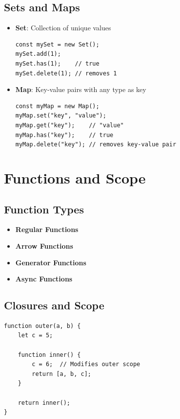 \documentclass{article}
\begin{document}
\subsection{Sets and Maps}
\begin{itemize}
    \item \textbf{Set}: Collection of unique values
    \begin{lstlisting}
const mySet = new Set();
mySet.add(1);
mySet.has(1);    // true
mySet.delete(1); // removes 1
    \end{lstlisting}
    
    \item \textbf{Map}: Key-value pairs with any type as key
    \begin{lstlisting}
const myMap = new Map();
myMap.set("key", "value");
myMap.get("key");    // "value"
myMap.has("key");    // true
myMap.delete("key"); // removes key-value pair
    \end{lstlisting}
\end{itemize}

\section{Functions and Scope}

\subsection{Function Types}
\begin{itemize}
    \item \textbf{Regular Functions}
    \item \textbf{Arrow Functions}
    \item \textbf{Generator Functions}
    \item \textbf{Async Functions}
\end{itemize}

\subsection{Closures and Scope}
\begin{lstlisting}
function outer(a, b) {
    let c = 5;
    
    function inner() {
        c = 6;  // Modifies outer scope
        return [a, b, c];
    }
    
    return inner();
}
\end{lstlisting}
\end{document}

